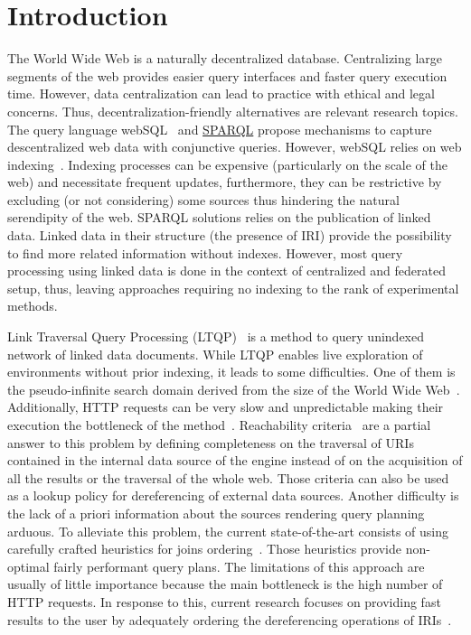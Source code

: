 \section{Introduction}

The World Wide Web is a naturally decentralized database.
Centralizing large segments of the web provides easier query interfaces and faster query execution time.
However, data centralization can lead to practice with ethical and legal concerns.
Thus, decentralization-friendly alternatives are relevant research topics.
The query language webSQL~\cite{Mendelzon1996} and \href{https://www.w3.org/TR/sparql11-query/}{SPARQL} propose mechanisms to capture descentralized web data with conjunctive queries.
However, webSQL relies on web indexing~\cite{Mendelzon1996}.
Indexing processes can be expensive (particularly on the scale of the web) and necessitate frequent updates, furthermore, they can be restrictive by excluding (or not considering) some sources thus hindering the natural serendipity of the web.
SPARQL solutions relies on the publication of linked data.
Linked data in their structure (the presence of IRI) provide the possibility to find more related information without indexes.
However, most query processing using linked data is done in the context of centralized and federated setup, thus, leaving approaches requiring no indexing to the rank of experimental methods. 

Link Traversal Query Processing (LTQP)~\cite{Hartig2012} is a method to query unindexed network of linked data documents.
While LTQP enables live exploration of environments without prior indexing, it leads to some difficulties.
One of them is the pseudo-infinite search domain derived from the size of the World Wide Web~\cite{hartig2016walking}.
Additionally, HTTP requests can be very slow and unpredictable making their execution the bottleneck of the method~\cite{hartig2016walking}.
Reachability criteria~\cite{Hartig2012} are a partial answer to this problem by defining completeness on the traversal of URIs
contained in the internal data source of the engine instead of on the acquisition of all the results or the traversal of the whole web.
Those criteria can also be used as a lookup policy for dereferencing of external data sources.
Another difficulty is the lack of a priori information about the sources rendering query planning arduous.
To alleviate this problem, the current state-of-the-art consists of using carefully crafted heuristics for joins ordering~\cite{Hartig2011}.
Those heuristics provide non-optimal fairly performant query plans.
The limitations of this approach are usually of little importance because the main bottleneck is the high number of HTTP requests.
In response to this, current research focuses on providing fast results to the user by adequately ordering the dereferencing operations of IRIs~\cite{hartig2016walking}.

